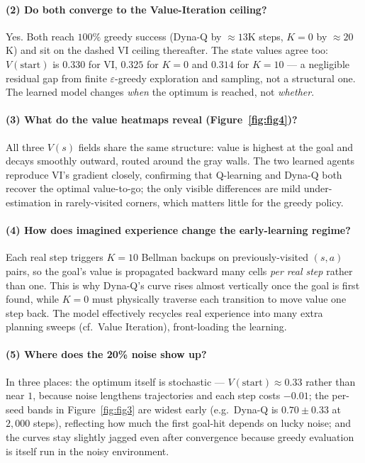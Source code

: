 \documentclass[11pt]{article}
\begin{document}
\paragraph{(2) Do both converge to the Value-Iteration ceiling?}
Yes. Both reach $100\%$ greedy success (Dyna-Q by $\approx13$K steps, $K{=}0$ by
$\approx20$K) and sit on the dashed VI ceiling thereafter. The state values agree
too: $V(\text{start})$ is $0.330$ for VI, $0.325$ for $K{=}0$ and $0.314$ for
$K{=}10$ --- a negligible residual gap from finite $\varepsilon$-greedy
exploration and sampling, not a structural one. The learned model changes
\emph{when} the optimum is reached, not \emph{whether}.

\paragraph{(3) What do the value heatmaps reveal (Figure~\ref{fig:fig4})?}
All three $V(s)$ fields share the same structure: value is highest at the goal and
decays smoothly outward, routed around the gray walls. The two learned agents
reproduce VI's gradient closely, confirming that Q-learning and Dyna-Q both
recover the optimal value-to-go; the only visible differences are mild
under-estimation in rarely-visited corners, which matters little for the greedy
policy.

\paragraph{(4) How does imagined experience change the early-learning regime?}
Each real step triggers $K{=}10$ Bellman backups on previously-visited $(s,a)$
pairs, so the goal's value is propagated backward many cells \emph{per real step}
rather than one. This is why Dyna-Q's curve rises almost vertically once the goal
is first found, while $K{=}0$ must physically traverse each transition to move
value one step back. The model effectively recycles real experience into many
extra planning sweeps (cf.\ Value Iteration), front-loading the learning.

\paragraph{(5) Where does the 20\% noise show up?}
In three places: the optimum itself is stochastic --- $V(\text{start})\approx0.33$
rather than near $1$, because noise lengthens trajectories and each step costs
$-0.01$; the per-seed bands in Figure~\ref{fig:fig3} are widest early (e.g.\
Dyna-Q is $0.70\pm0.33$ at $2{,}000$ steps), reflecting how much the first
goal-hit depends on lucky noise; and the curves stay slightly jagged even after
convergence because greedy evaluation is itself run in the noisy environment.
\end{document}
